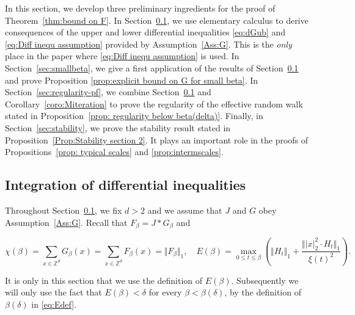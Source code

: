 \documentclass[11pt,a4paper]{article}
\numberwithin{equation}{section}
\theoremstyle{plain}
\theoremstyle{definition}
\newcommand\1{\mathds{1}}
\begin{document}
In this section, we develop three preliminary ingredients
for the proof of Theorem~\ref{thm:bound on F}.
In Section~\ref{sec:integration}, we use elementary calculus to derive consequences of the upper and lower differential inequalities \eqref{eq:dGub} and \eqref{eq:Diff inequ assumption} provided by Assumption~\ref{Ass:G}. This is the \emph{only} place in the paper where \eqref{eq:Diff inequ assumption} is used. In Section~\ref{sec:smallbeta}, we give a first application of the results of Section~\ref{sec:integration} and prove Proposition \ref{prop:explicit bound on G for small beta}. In
Section~\ref{sec:regularity-pf}, we combine
Section~\ref{sec:integration} and Corollary~\ref{coro:Miteration} to prove the regularity of the effective random walk
stated in Proposition~\ref{prop: regularity below beta(delta)}. Finally, in Section~\ref{sec:stability}, we prove the stability result
stated in Proposition~\ref{Prop:Stability section 2}. It plays an important role in the proofs of Propositions~\ref{prop: typical scales} and \ref{prop:intermscales}.



\subsection{Integration of differential inequalities}
\label{sec:integration}

Throughout Section~\ref{sec:integration}, we fix $d>2$ and
 we assume that $J$ and $G$ obey Assumption~\ref{Ass:G}.
Recall that $F_\beta = J*G_\beta$ and


\begin{equation}
	\chi(\beta)=\sum_{x\in \mathbb Z^d}G_\beta(x)=\sum_{x\in \mathbb Z^d}F_\beta(x) = \Vert F_\beta\Vert_1,
    \quad
    E(\beta)=\max_{0\leq t \leq \beta}
    \left(\Vert H_t\Vert_1 + \frac{\Vert |x|_2^2\cdot H_t\Vert_1}{\xi(t)^2}\right).
\end{equation}

It is only in this section that we use the definition of $E(\beta)$. Subsequently
we will only use the fact that $E(\beta) <\delta$ for every $\beta <\beta(\delta)$, by the definition of $\beta(\delta)$ in \eqref{eq:Edef}.
\end{document}
